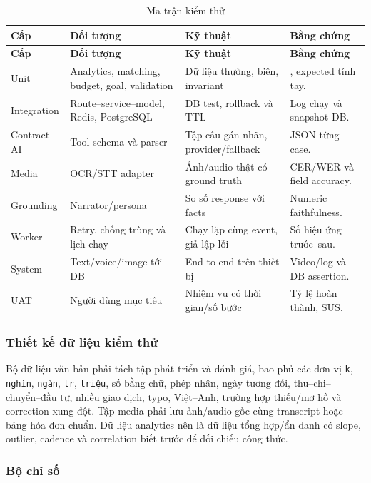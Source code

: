 \begin{longtable}{@{}L{2.1cm}L{3.5cm}L{3.5cm}L{3.5cm}@{}}
  \caption{Ma trận kiểm thử}\label{tab:test-matrix}\\
  \toprule
  \textbf{Cấp} & \textbf{Đối tượng} & \textbf{Kỹ thuật} & \textbf{Bằng chứng} \\
  \midrule
  \endfirsthead
  \toprule
  \textbf{Cấp} & \textbf{Đối tượng} & \textbf{Kỹ thuật} & \textbf{Bằng chứng} \\
  \midrule
  \endhead
  Unit & Analytics, matching, budget, goal, validation & Dữ liệu thường, biên, invariant & , expected tính tay. \\
  Integration & Route--service--model, Redis, PostgreSQL & DB test, rollback và TTL & Log chạy và snapshot DB. \\
  Contract AI & Tool schema và parser & Tập câu gán nhãn, provider/fallback & JSON từng case. \\
  Media & OCR/STT adapter & Ảnh/audio thật có ground truth & CER/WER và field accuracy. \\
  Grounding & Narrator/persona & So số response với facts & Numeric faithfulness. \\
  Worker & Retry, chống trùng và lịch chạy & Chạy lặp cùng event, giả lập lỗi & Số hiệu ứng trước--sau. \\
  System & Text/voice/image tới DB & End-to-end trên thiết bị & Video/log và DB assertion. \\
  UAT & Người dùng mục tiêu & Nhiệm vụ có thời gian/số bước & Tỷ lệ hoàn thành, SUS. \\
  \bottomrule
\end{longtable}

\subsubsection{Thiết kế dữ liệu kiểm thử}

Bộ dữ liệu văn bản phải tách tập phát triển và đánh giá, bao phủ các đơn vị \texttt{k}, \texttt{nghìn}, \texttt{ngàn}, \texttt{tr}, \texttt{triệu}, số bằng chữ, phép nhân, ngày tương đối, thu--chi--chuyển--đầu tư, nhiều giao dịch, typo, Việt--Anh, trường hợp thiếu/mơ hồ và correction xung đột. Tập media phải lưu ảnh/audio gốc cùng transcript hoặc bảng hóa đơn chuẩn. Dữ liệu analytics nên là dữ liệu tổng hợp/ẩn danh có slope, outlier, cadence và correlation biết trước để đối chiếu công thức.

\subsubsection{Bộ chỉ số}

